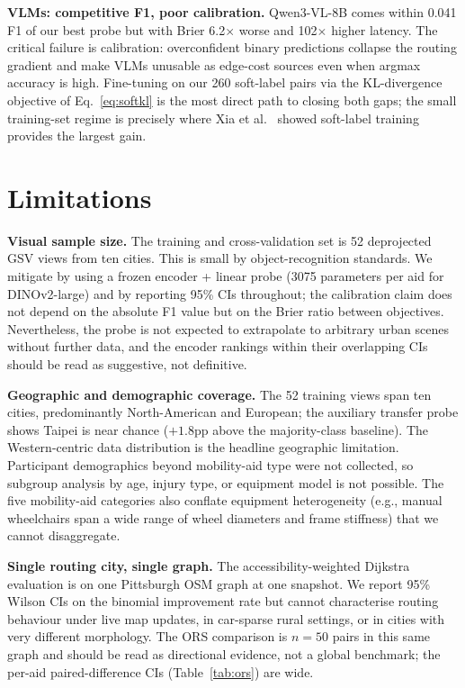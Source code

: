 \documentclass[conference]{IEEEtran}
\begin{document}
\textbf{VLMs: competitive F1, poor calibration.} Qwen3-VL-8B comes within 0.041 F1 of our best probe but with Brier 6.2$\times$ worse and 102$\times$ higher latency. The critical failure is calibration: overconfident binary predictions collapse the routing gradient and make VLMs unusable as edge-cost sources even when argmax accuracy is high. Fine-tuning on our 260 soft-label pairs via the KL-divergence objective of Eq.~\ref{eq:softkl} is the most direct path to closing both gaps; the small training-set regime is precisely where Xia et al.~\cite{xia2025softlabels} showed soft-label training provides the largest gain.

\section{Limitations}
\label{sec:limitations}

\textbf{Visual sample size.} The training and cross-validation set is 52 deprojected GSV views from ten cities. This is small by object-recognition standards. We mitigate by using a frozen encoder + linear probe (3075 parameters per aid for DINOv2-large) and by reporting 95\% CIs throughout; the calibration claim does not depend on the absolute F1 value but on the Brier ratio between objectives. Nevertheless, the probe is not expected to extrapolate to arbitrary urban scenes without further data, and the encoder rankings within their overlapping CIs should be read as suggestive, not definitive.

\textbf{Geographic and demographic coverage.} The 52 training views span ten cities, predominantly North-American and European; the auxiliary transfer probe shows Taipei is near chance ($+1.8$pp above the majority-class baseline). The Western-centric data distribution is the headline geographic limitation. Participant demographics beyond mobility-aid type were not collected, so subgroup analysis by age, injury type, or equipment model is not possible. The five mobility-aid categories also conflate equipment heterogeneity (e.g., manual wheelchairs span a wide range of wheel diameters and frame stiffness) that we cannot disaggregate.

\textbf{Single routing city, single graph.} The accessibility-weighted Dijkstra evaluation is on one Pittsburgh OSM graph at one snapshot. We report 95\% Wilson CIs on the binomial improvement rate but cannot characterise routing behaviour under live map updates, in car-sparse rural settings, or in cities with very different morphology. The ORS comparison is $n=50$ pairs in this same graph and should be read as directional evidence, not a global benchmark; the per-aid paired-difference CIs (Table~\ref{tab:ors}) are wide.
\end{document}
